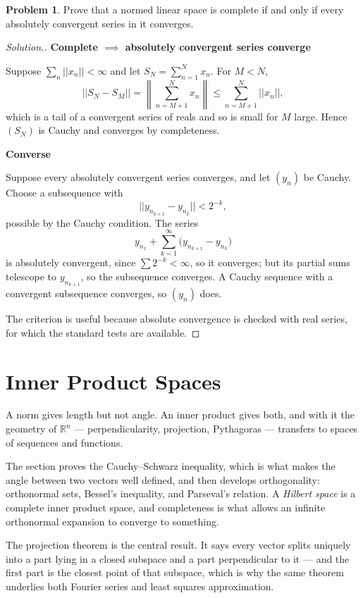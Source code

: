 \documentclass[11pt,a4paper]{article}
\theoremstyle{definition}
\newtheorem{problemx}{Problem}[section]
\newenvironment{problem}{\begin{problemx}}{\end{problemx}}
\newenvironment{solution}
  {\renewcommand{\qedsymbol}{}\begin{proof}[\textit{Solution}.]}
  {\end{proof}}
\newcommand{\subhead}[1]{%
  \par\medskip\noindent\textbf{#1}\par\nobreak\smallskip}
\begin{document}
\begin{problem}
Prove that a normed linear space is complete if and only if every absolutely
convergent series in it converges.
\end{problem}
\begin{solution}
\subhead{Complete $\implies$ absolutely convergent series converge}
Suppose $\sum_n ||x_n||<\infty$ and let $S_N=\sum_{n=1}^{N}x_n$. For $M<N$,
$$||S_N-S_M||=\left\|\sum_{n=M+1}^{N}x_n\right\|\leq\sum_{n=M+1}^{N}||x_n|| ,$$
which is a tail of a convergent series of reals and so is small for $M$ large.
Hence $(S_N)$ is Cauchy and converges by completeness.

\subhead{Converse}
Suppose every absolutely convergent series converges, and let $(y_n)$ be Cauchy.
Choose a subsequence with
$$||y_{n_{k+1}}-y_{n_k}||<2^{-k} ,$$
possible by the Cauchy condition. The series
$$y_{n_1}+\sum_{k=1}^{\infty}\big(y_{n_{k+1}}-y_{n_k}\big)$$
is absolutely convergent, since $\sum 2^{-k}<\infty$, so it converges; but its
partial sums telescope to $y_{n_{k+1}}$, so the subsequence converges. A Cauchy
sequence with a convergent subsequence converges, so $(y_n)$ does.

The criterion is useful because absolute convergence is checked with real
series, for which the standard tests are available.
\end{solution}


\section{Inner Product Spaces}
A norm gives length but not angle. An inner product gives both, and with it the
geometry of $\mathbb{R}^n$ --- perpendicularity, projection, Pythagoras ---
transfers to spaces of sequences and functions.

The section proves the Cauchy--Schwarz inequality, which is what makes the angle
between two vectors well defined, and then develops orthogonality: orthonormal
sets, Bessel's inequality, and Parseval's relation. A \emph{Hilbert space} is a
complete inner product space, and completeness is what allows an infinite
orthonormal expansion to converge to something.

The projection theorem is the central result. It says every vector splits
uniquely into a part lying in a closed subspace and a part perpendicular to it
--- and the first part is the closest point of that subspace, which is why the
same theorem underlies both Fourier series and least squares approximation.
 
\end{document}
